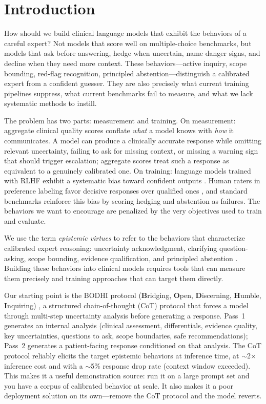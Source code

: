 \documentclass{article}
\newcommand{\bodhi}{BODHI}
\begin{document}
\section{Introduction}
\label{sec:intro}

How should we build clinical language models that exhibit the behaviors of a careful expert? Not models that score well on multiple-choice benchmarks, but models that ask before answering, hedge when uncertain, name danger signs, and decline when they need more context. These behaviors---active inquiry, scope bounding, red-flag recognition, principled abstention---distinguish a calibrated expert from a confident guesser. They are also precisely what current training pipelines suppress, what current benchmarks fail to measure, and what we lack systematic methods to instill.

The problem has two parts: measurement and training. On measurement: aggregate clinical quality scores conflate \emph{what} a model knows with \emph{how} it communicates. A model can produce a clinically accurate response while omitting relevant uncertainty, failing to ask for missing context, or missing a warning sign that should trigger escalation; aggregate scores treat such a response as equivalent to a genuinely calibrated one. On training: language models trained with RLHF exhibit a systematic bias toward confident outputs \citep{kadavath2022language, lin2022teaching}. Human raters in preference labeling favor decisive responses over qualified ones \citep{xiong2024can}, and standard benchmarks reinforce this bias by scoring hedging and abstention as failures. The behaviors we want to encourage are penalized by the very objectives used to train and evaluate.

We use the term \emph{epistemic virtues} to refer to the behaviors that characterize calibrated expert reasoning: uncertainty acknowledgment, clarifying question-asking, scope bounding, evidence qualification, and principled abstention \citep{singhal2023medpalm, nori2023capabilities}. Building these behaviors into clinical models requires tools that can measure them precisely and training approaches that can target them directly.

Our starting point is the \bodhi{} protocol (\textbf{B}ridging, \textbf{O}pen, \textbf{D}iscerning, \textbf{H}umble, \textbf{I}nquiring) \citep{bodhi2026}, a structured chain-of-thought (CoT) protocol that forces a model through multi-step uncertainty analysis before generating a response. Pass~1 generates an internal analysis (clinical assessment, differentials, evidence quality, key uncertainties, questions to ask, scope boundaries, safe recommendations); Pass~2 generates a patient-facing response conditioned on that analysis. The CoT protocol reliably elicits the target epistemic behaviors at inference time, at $\sim$2$\times$ inference cost and with a $\sim$5\% response drop rate (context window exceeded). This makes it a useful demonstration source: run it on a large prompt set and you have a corpus of calibrated behavior at scale. It also makes it a poor deployment solution on its own---remove the CoT protocol and the model reverts.
\end{document}
